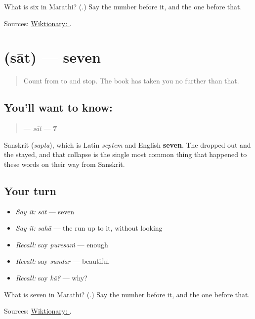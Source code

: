 \begin{tcolorbox}[breakable,colback=teal!4,colframe=teal!35!black,title={Before you move on}]
What is six in Marathi? (\textbf{}.) Say the number before it, and the one before that.

Sources: \href{https://en.wiktionary.org/wiki/\%E0\%A4\%B8\%E0\%A4\%B9\%E0\%A4\%BE}{Wiktionary: }.
\end{tcolorbox}
\section[\texorpdfstring{\mr{सात} (sāt)}{सात (sāt)}]{ (sāt) — seven}

\label{lesson:MR-C55-saat}



\begin{quote}
Count from \textbf{} to \textbf{} and stop. The book has taken you no further than that.
\end{quote}

\subsection*{You'll want to know: }
\begin{quote}
\textbf{} — \emph{sāt} — \textbf{7}
\end{quote}

Sanskrit \textbf{} (\emph{sapta}), which is Latin \emph{septem} and English \textbf{seven}. The \textbf{} dropped out and the \textbf{} stayed, and that collapse is the single most common thing that happened to these words on their way from Sanskrit.

\subsection*{Your turn}
\begin{itemize}
\raggedright
  \item \emph{Say it:} \emph{sāt} — seven
  \item \emph{Say it:} \emph{sahā} — the run up to it, without looking
  \item \emph{Recall:} say \emph{puresaṁ} — enough
  \item \emph{Recall:} say \emph{sundar} — beautiful
  \item \emph{Recall:} say \emph{kā?} — why?
\end{itemize}

\begin{tcolorbox}[breakable,colback=teal!4,colframe=teal!35!black,title={Before you move on}]
What is seven in Marathi? (\textbf{}.) Say the number before it, and the one before that.

Sources: \href{https://en.wiktionary.org/wiki/\%E0\%A4\%B8\%E0\%A4\%BE\%E0\%A4\%A4}{Wiktionary: }.
\end{tcolorbox}
